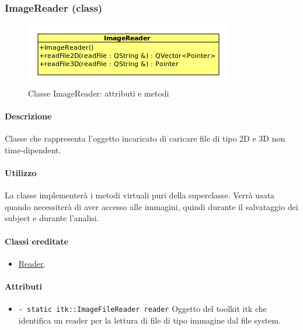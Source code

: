 \subsubsection{ImageReader (class)}
\label{speimagereader}
\begin{figure}[!h]
\centering
			\includegraphics[scale=1]{./Content/Immagini/model/ImageReader.png}
			\caption{Classe ImageReader: attributi e metodi}
			\label{cl_imagereader}
\end{figure}
\paragraph{Descrizione \\}
Classe che rappresenta l'oggetto incaricato di caricare file di tipo 2D e 3D non time-dipendent.
\paragraph{Utilizzo\\}
La classe implementerà i metodi virtuali puri della superclasse. Verrà usata quando \project{} necessiterà di aver accesso alle immagini, quindi durante il salvataggio dei subject e durante l'analisi.
\paragraph{Classi ereditate\\}
	\begin{itemize}
		\item \hyperref[spereader]{Reader}.
	\end{itemize}
\paragraph{\color{black}Attributi \\}
	\begin{itemize}
		\item \color{blue}\verb!- static itk::ImageFileReader reader!
		\color{black}Oggetto del toolkit itk che identifica un reader per la lettura di file di tipo immagine dal file system.
	\end{itemize}
